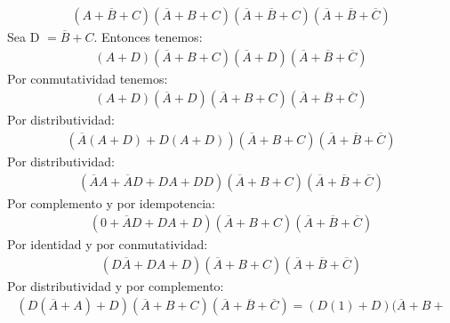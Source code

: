 \documentclass[answers]{exam}
\begin{document}
\begin{questions}
\begin{solution}
\begin{enumerate}
\begin{itemize}
                    \begin{gather*}
                      (A + \overline{B} + C)(\overline{A} + B + C)(\overline{A} +%
                      \overline{B} + C)(\overline{A} + \overline{B} + \overline{C})
                    \end{gather*}
                    Sea D $= \overline{B} + C$. Entonces tenemos:
                    \begin{gather*}
                      (A + D)(\overline{A} + B + C)(\overline{A} + D)(\overline{A} +%
                      \overline{B} + \overline{C})
                    \end{gather*}
                    Por conmutatividad tenemos:
                    \begin{gather*}
                      (A + D)(\overline{A} + D)(\overline{A} + B + C)(\overline{A} +%
                      \overline{B} + \overline{C})
                    \end{gather*}
                    Por distributividad:
                    \begin{gather*}
                      (\overline{A}(A + D) + D(A + D))(\overline{A} + B + C)(\overline{A}%
                      + \overline{B} + \overline{C})
                    \end{gather*}
                    Por distributividad:
                    \begin{gather*}
                      (\overline{A}A + \overline{A}D + DA + DD)(\overline{A} + B +%
                      C)(\overline{A} + \overline{B} + \overline{C})
                    \end{gather*}
                    Por complemento y por idempotencia:
                    \begin{gather*}
                      (0 + \overline{A}D + DA + D)(\overline{A} + B + C)(\overline{A} +%
                      \overline{B} + \overline{C})
                    \end{gather*}
                    Por identidad y por conmutatividad:
                    \begin{gather*}
                      (D\overline{A} + DA + D)(\overline{A} + B + C)(\overline{A} +%
                      \overline{B} + \overline{C})
                    \end{gather*}
                    Por distributividad y por complemento:
                    \begin{gather*}
                      (D(\overline{A} + A) + D)(\overline{A} + B + C)(\overline{A} +%
                      \overline{B} + \overline{C}) = (D(1) + D)(\overline{A} + B +%

\end{gather*}
\end{itemize}
\end{enumerate}
\end{solution}
\end{questions}
\end{document}

